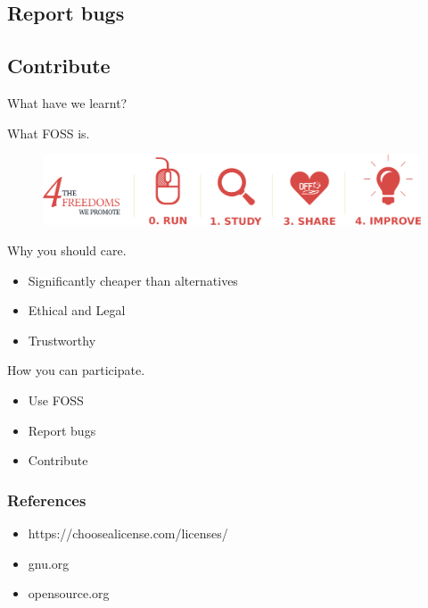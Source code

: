 \documentclass{beamer}
\begin{document}
	\subsection{Report bugs}
	\subsection{Contribute}
	

	\begin{frame}{What have we learnt?}
		\begin{block}{What FOSS is.}
			\begin{figure}
				\includegraphics[scale =0.4]{4freedoms.png}
			\end{figure}
		\end{block}
		\begin{block}{Why you should care.}
		\begin{itemize}
			\item Significantly cheaper than alternatives
			\item Ethical and Legal
			\item Trustworthy
		\end{itemize}
	\end{block}
		\begin{block}{How you can participate.}
		\begin{itemize}
			\item Use FOSS
			\item Report bugs
			\item Contribute
		\end{itemize}
		\end{block}
	\end{frame}

	
	\begin{frame}
		\frametitle{References}
		\footnotesize{
		\begin{itemize}
			\item https://choosealicense.com/licenses/
			\item gnu.org
			\item opensource.org
		\end{itemize}
		}
	\end{frame}
	
\end{document}

